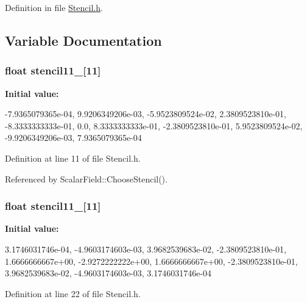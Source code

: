 Definition in file \hyperlink{Stencil_8h_source}{Stencil.h}.



\subsection{Variable Documentation}
\subsubsection[{stencil11\_\-1}]{\setlength{\rightskip}{0pt plus 5cm}float {\bf stencil11\_}\mbox{[}11\mbox{]}}\label{Stencil_8h_a5ff00e186b05d9309740857597092be3}
{\bfseries Initial value:}
\begin{DoxyCode}
 { -7.9365079365e-04,
                  9.9206349206e-03,
                  -5.9523809524e-02,
                  2.3809523810e-01,
                  -8.3333333333e-01,
                  0.0,
                  8.3333333333e-01,
                  -2.3809523810e-01,
                  5.9523809524e-02,
                  -9.9206349206e-03,
                  7.9365079365e-04 }
\end{DoxyCode}


Definition at line 11 of file Stencil.h.



Referenced by ScalarField::ChooseStencil().

\subsubsection[{stencil11\_\-2}]{\setlength{\rightskip}{0pt plus 5cm}float {\bf stencil11\_}\mbox{[}11\mbox{]}}\label{Stencil_8h_aa8aaf37307346bc1ebc679eae8d5b8f0}
{\bfseries Initial value:}
\begin{DoxyCode}
 { 3.1746031746e-04,
                  -4.9603174603e-03,
                  3.9682539683e-02,
                  -2.3809523810e-01,
                  1.6666666667e+00,
                  -2.9272222222e+00,
                  1.6666666667e+00,
                  -2.3809523810e-01,
                  3.9682539683e-02,
                  -4.9603174603e-03,
                  3.1746031746e-04 }
\end{DoxyCode}


Definition at line 22 of file Stencil.h.



